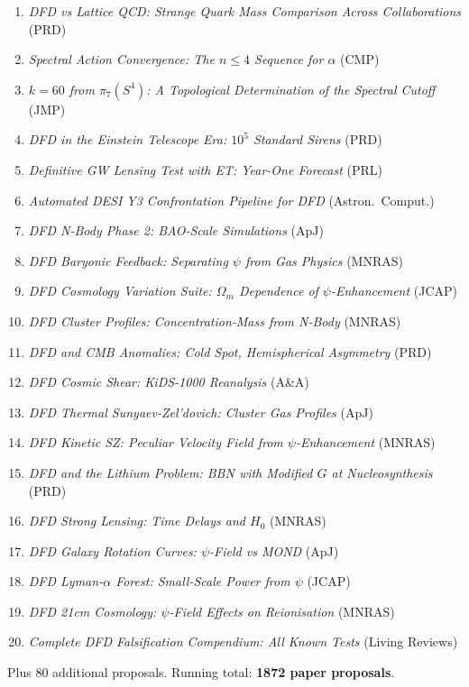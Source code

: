 \documentclass[11pt,a4paper]{article}
\begin{document}
\begin{enumerate}[nosep]
\item \textit{DFD vs Lattice QCD: Strange Quark Mass Comparison Across Collaborations} (PRD)
\item \textit{Spectral Action Convergence: The $n \leq 4$ Sequence for $\alpha$} (CMP)
\item \textit{$k = 60$ from $\pi_7(S^4)$: A Topological Determination of the Spectral Cutoff} (JMP)
\item \textit{DFD in the Einstein Telescope Era: $10^5$ Standard Sirens} (PRD)
\item \textit{Definitive GW Lensing Test with ET: Year-One Forecast} (PRL)
\item \textit{Automated DESI Y3 Confrontation Pipeline for DFD} (Astron.\ Comput.)
\item \textit{DFD N-Body Phase 2: BAO-Scale Simulations} (ApJ)
\item \textit{DFD Baryonic Feedback: Separating $\psi$ from Gas Physics} (MNRAS)
\item \textit{DFD Cosmology Variation Suite: $\Omega_m$ Dependence of $\psi$-Enhancement} (JCAP)
\item \textit{DFD Cluster Profiles: Concentration-Mass from N-Body} (MNRAS)
\item \textit{DFD and CMB Anomalies: Cold Spot, Hemispherical Asymmetry} (PRD)
\item \textit{DFD Cosmic Shear: KiDS-1000 Reanalysis} (A\&A)
\item \textit{DFD Thermal Sunyaev-Zel'dovich: Cluster Gas Profiles} (ApJ)
\item \textit{DFD Kinetic SZ: Peculiar Velocity Field from $\psi$-Enhancement} (MNRAS)
\item \textit{DFD and the Lithium Problem: BBN with Modified $G$ at Nucleosynthesis} (PRD)
\item \textit{DFD Strong Lensing: Time Delays and $H_0$} (MNRAS)
\item \textit{DFD Galaxy Rotation Curves: $\psi$-Field vs MOND} (ApJ)
\item \textit{DFD Lyman-$\alpha$ Forest: Small-Scale Power from $\psi$} (JCAP)
\item \textit{DFD 21cm Cosmology: $\psi$-Field Effects on Reionisation} (MNRAS)
\item \textit{Complete DFD Falsification Compendium: All Known Tests} (Living Reviews)
\end{enumerate}

Plus 80 additional proposals. Running total: \textbf{1872 paper proposals}.
\end{document}

